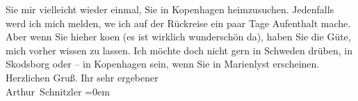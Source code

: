 \begin{ledgroupsized}[t]{13cm}
               Sie mir vielleicht wieder einmal, Sie in Kopenhagen heimzusuchen. Jedenfalls werd ich mich melden, we{\geminationn} ich auf der Rückreise ein paar Tage Aufenthalt mache.
               Aber wenn Sie hieher ko{\geminationm}en (es ist wirklich wunderschön
               da), haben Sie die Güte, mich vorher wissen zu lassen. Ich möchte doch nicht gern in
                  Schweden drüben, in Skodsborg oder – in Kopenhagen sein, wenn Sie in Marienlyst
               erscheinen.\pend
           \pstart
           Herzlichen Gruß. Ihr sehr ergebener{\\[\baselineskip]}\spacefill\mbox{Arthur Schnitzler}\pend
           \leftskip=0em{}
         
         \endnumbering{}\end{ledgroupsized}  \newcommand{\dateiname}{L01610}\newcommand{\titel}{Arthur Schnitzler an Georg Brandes, 13. 7. 1906}\newcommand{\editorInnen}{Martin Anton Müller und Gerd-Hermann Susen}
      